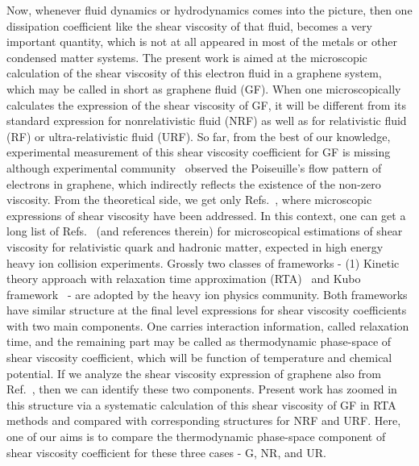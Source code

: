 \documentclass[%
 reprint,
 amsmath,amssymb,
 aps,
]{revtex4-2}
\begin{document}
%
    Now, whenever fluid dynamics or hydrodynamics comes into the picture, then one dissipation coefficient like the shear viscosity of that fluid, becomes a very important quantity, which is not at all appeared in most of the metals or other condensed matter systems. The present work is aimed at the microscopic calculation of the shear viscosity of this electron fluid in a graphene system, which may be called in short as graphene fluid (GF). When one microscopically calculates the expression of the shear viscosity of GF, it will be different from its standard expression for nonrelativistic fluid (NRF) as well as for relativistic fluid (RF) or ultra-relativistic fluid (URF).    
%
    So far, from the best of our knowledge, experimental measurement of this shear viscosity coefficient for GF is missing although experimental community~\cite{1Ku:2019lgj,9sulpizio2019visualizing} observed the Poiseuille's flow pattern of electrons in graphene, which indirectly reflects the existence of the non-zero viscosity. From the theoretical side, we get only Refs.~\cite{24PhysRevLett.103.025301, Vignale, PhysRevB.97.Russian, PhysRevB.107.Ele_Vis, PhysRevB.100.Magneto}, where microscopic expressions of shear viscosity have been addressed. In this context, one can get a long list of Refs.~\cite{QGP1, QGP2, QGP3, QGP4, QGP5, QGP6, QGP7, QGP8, QGP9, QGP10} (and references therein) for microscopical estimations of shear viscosity for relativistic quark and hadronic matter, expected in high energy heavy ion collision experiments. Grossly two classes of frameworks - (1) Kinetic theory approach with relaxation time approximation (RTA)~\cite{QGP1, QGP2, QGP3, QGP4, QGP5, QGP6, QGP7} and Kubo framework~\cite{QGP8, QGP9, QGP10} - are adopted by the heavy ion physics community. Both frameworks have similar structure at the final level expressions for shear viscosity coefficients with two main components. One carries interaction information, called relaxation time, and the remaining part may be called as thermodynamic phase-space of shear viscosity coefficient, which will be function of temperature and chemical potential. If we analyze the shear viscosity expression of graphene also from Ref.~\cite{24PhysRevLett.103.025301}, then we can identify these two components. Present work has zoomed in this structure via a systematic calculation of this shear viscosity of GF in RTA methods and compared with corresponding structures for NRF and URF. Here, one of our aims is to compare the thermodynamic phase-space component of shear viscosity coefficient for these three cases - G, NR, and UR.  
\end{document}
